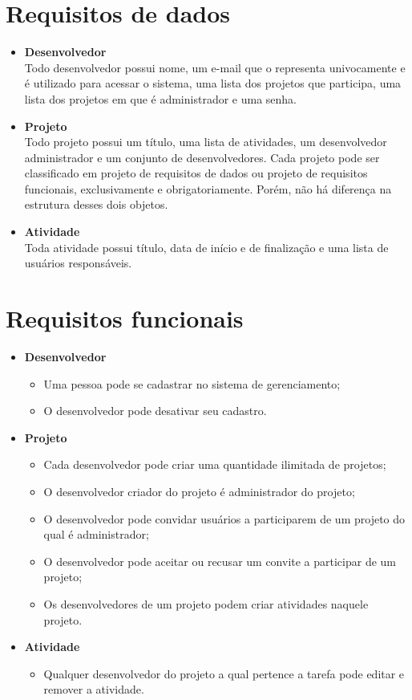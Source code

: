 \documentclass{article}
\begin{document}
\section{Requisitos de dados}
\begin{itemize}
    \item \textbf{Desenvolvedor}
    \\ Todo desenvolvedor possui nome, um e-mail que o representa univocamente e é utilizado para acessar o sistema, uma lista dos projetos que participa, uma lista dos projetos em que é administrador e uma senha.
    \item \textbf{Projeto}
    \\Todo projeto possui um título, uma lista de atividades, um desenvolvedor administrador e um conjunto de desenvolvedores. Cada projeto pode ser classificado em projeto de requisitos de dados ou projeto de requisitos funcionais, exclusivamente e obrigatoriamente. Porém, não há diferença na estrutura desses dois objetos.
    \item \textbf{Atividade}
    \\Toda atividade possui título, data de início e de finalização e uma lista de usuários responsáveis.
\end{itemize}
\section{Requisitos funcionais}
\begin{itemize}
    \item \textbf{Desenvolvedor}
    \begin{itemize}
        \item Uma pessoa pode se cadastrar no sistema de gerenciamento;
        \item O desenvolvedor pode desativar seu cadastro.
    \end{itemize}
    \item \textbf{Projeto}
    \begin{itemize}
        \item Cada desenvolvedor pode criar uma quantidade ilimitada de projetos;
        \item O desenvolvedor criador do projeto é administrador do projeto;
        \item O desenvolvedor pode convidar usuários a participarem de um projeto do qual é administrador;
        \item O desenvolvedor pode aceitar ou recusar um convite a participar de um projeto;
        \item Os desenvolvedores de um projeto podem criar atividades naquele projeto.
    \end{itemize}
    \item \textbf{Atividade}
    \begin{itemize}
        \item Qualquer desenvolvedor do projeto a qual pertence a tarefa pode editar e remover a atividade.
    \end{itemize}
\end{itemize}
\end{document}
